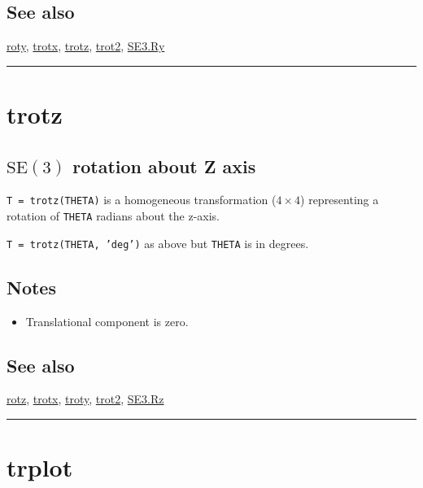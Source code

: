 \subsection*{See also}


\hyperlink{roty}{\color{blue} roty}, \hyperlink{trotx}{\color{blue} trotx}, \hyperlink{trotz}{\color{blue} trotz}, \hyperlink{trot2}{\color{blue} trot2}, \hyperlink{SE3.Ry}{\color{blue} SE3.Ry}

\vspace{1.5ex}\rule{\textwidth}{1mm}

\hypertarget{trotz}{\section*{trotz}}
\subsection*{$\mbox{SE}(3)$ rotation about Z axis}


\texttt{T = trotz(THETA)} is a homogeneous transformation ($4 \times 4$) representing a rotation
of \texttt{THETA} radians about the z-axis.



\texttt{T = trotz(THETA, 'deg')} as above but \texttt{THETA} is in degrees.


\subsection*{Notes}
\begin{itemize}
  \item Translational component is zero.
\end{itemize}

\subsection*{See also}


\hyperlink{rotz}{\color{blue} rotz}, \hyperlink{trotx}{\color{blue} trotx}, \hyperlink{troty}{\color{blue} troty}, \hyperlink{trot2}{\color{blue} trot2}, \hyperlink{SE3.Rz}{\color{blue} SE3.Rz}

\vspace{1.5ex}\rule{\textwidth}{1mm}

\hypertarget{trplot}{\section*{trplot}}
